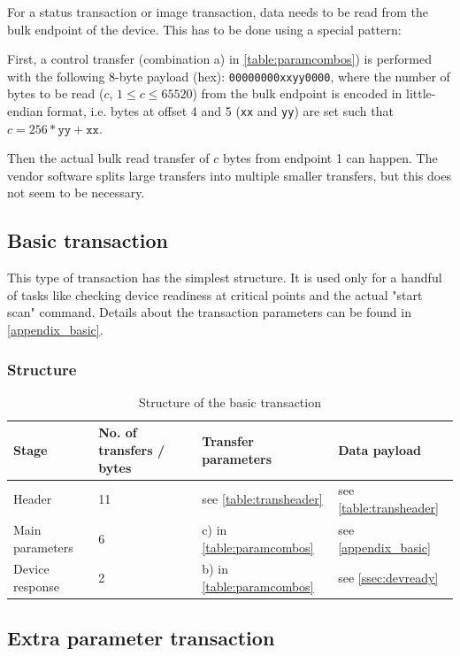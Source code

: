 \documentclass{article}
\begin{document}
For a status transaction or image transaction, data needs to be read from the bulk endpoint of the device.
This has to be done using a special pattern:

First, a control transfer (combination a) in \autoref{table:paramcombos}) is
performed with the following 8-byte payload (hex): {\tt 00000000xxyy0000},
where the number of bytes to be read ($c$, $1 \leq c \leq 65520$) from the bulk endpoint is encoded
in little-endian format, i.e. bytes at offset 4 and 5 ({\tt xx} and {\tt yy}) are set such that
$c = 256 * \texttt{yy} + \texttt{xx}$.

Then the actual bulk read transfer of $c$ bytes from endpoint 1 can happen. The vendor software
splits large transfers into multiple smaller transfers, but this does not seem
to be necessary.

\subsection{Basic transaction}
\label{ssec:basic_trans}

This type of transaction has the simplest structure. It is used only for a handful of tasks like
checking device readiness at critical points and the actual "start scan" command.
Details about the transaction parameters can be found in \autoref{appendix_basic}.

\subsubsection{Structure}

\begin{table}[H]
  \caption{Structure of the basic transaction}
  \centering
  \begin{tabular}{p{3cm} | p{1.5cm} | p{3cm} | p{3cm}}
    Stage & No. of transfers / bytes & Transfer parameters & Data payload \\ \hline
    
    Header & 11 & see \autoref{table:transheader} & see \autoref{table:transheader} \\
    Main parameters & 6 & c) in \autoref{table:paramcombos} & see \autoref{appendix_basic} \\
    Device response & 2 & b) in \autoref{table:paramcombos} & see \autoref{ssec:devready} \\
  \end{tabular}
\end{table}


\subsection{Extra parameter transaction}
\end{document}
